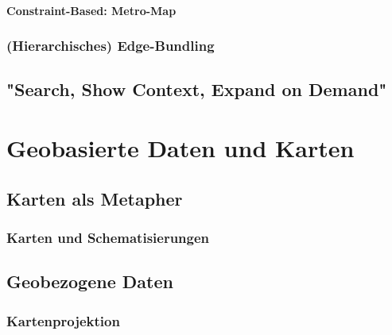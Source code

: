                 \paragraph{Constraint-Based: Metro-Map} %

            \subsubsection{(Hierarchisches) Edge-Bundling} %

        \subsection{"Search, Show Context, Expand on Demand"} %

    \section{Geobasierte Daten und Karten} %

        \subsection{Karten als Metapher} %

            \subsubsection{Karten und Schematisierungen} %

        \subsection{Geobezogene Daten} %

            \subsubsection{Kartenprojektion} %

